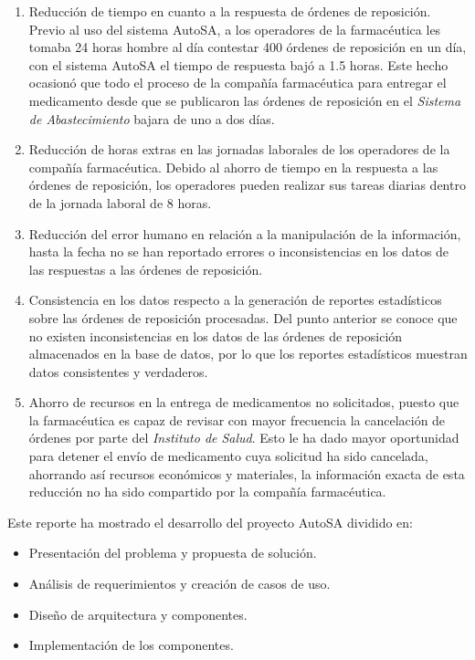\begin{enumerate}
	\item Reducción de tiempo en cuanto a la respuesta de órdenes de reposición. Previo al uso del sistema AutoSA, a los operadores de la farmacéutica les tomaba 24 horas hombre al día contestar 400 órdenes de reposición en un día, con el sistema AutoSA el tiempo de respuesta bajó a 1.5 horas. Este hecho ocasionó que todo el proceso de la compañía farmacéutica para entregar el medicamento desde que se publicaron las órdenes de reposición en el \textit{Sistema de Abastecimiento} bajara de uno a dos días.
	\item Reducción de horas extras en las jornadas laborales de los operadores de la compañía farmacéutica. Debido al ahorro de tiempo en la respuesta a las órdenes de reposición, los operadores pueden realizar sus tareas diarias dentro de la jornada laboral de 8 horas.
	\item Reducción del error humano en relación a la manipulación de la información, hasta la fecha no se han reportado errores o inconsistencias en los datos de las respuestas a las órdenes de reposición.
	\item Consistencia en los datos respecto a la generación de reportes estadísticos sobre las órdenes de reposición procesadas. Del punto anterior se conoce que no existen inconsistencias en los datos de las órdenes de reposición almacenados en la base de datos, por lo que los reportes estadísticos muestran datos consistentes y verdaderos.
	\item Ahorro de recursos en la entrega de medicamentos no solicitados, puesto que la farmacéutica es capaz de revisar con mayor frecuencia la cancelación de órdenes por parte del \textit{Instituto de Salud}. Esto le ha dado mayor oportunidad para detener el envío de medicamento cuya solicitud ha sido cancelada, ahorrando así recursos económicos y materiales, la información exacta de esta reducción no ha sido compartido por la compañía farmacéutica.
\end{enumerate}
Este reporte ha mostrado el desarrollo del proyecto AutoSA dividido en:
\begin{itemize}
	\item Presentación del problema y propuesta de solución. 
	\item Análisis de requerimientos y creación de casos de uso.
	\item Diseño de arquitectura y componentes.
	\item Implementación de los componentes.
\end{itemize}
